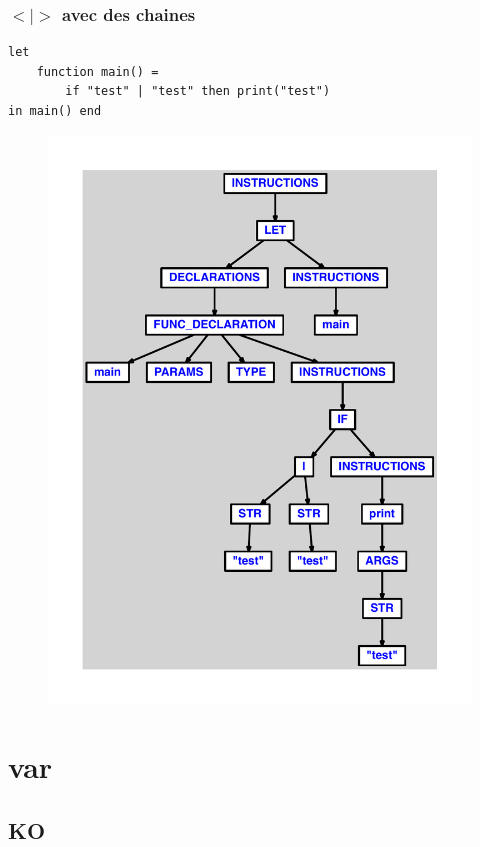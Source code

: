 \documentclass{article}
\begin{document}
\subsubsection{$ < $$ | $$ > $ avec des chaines}
\begin{lstlisting}
let
	function main() =
		if "test" | "test" then print("test")
in main() end
\end{lstlisting}
\newpage
\begin{figure}[H]
\centering
\includegraphics[max width=\textwidth]{ast/ast_287.pdf}
\end{figure}
\newpage
\section{var}
\subsection{KO}
\end{document}
